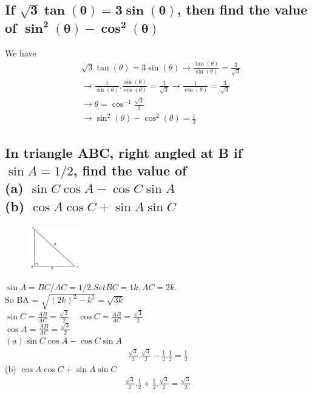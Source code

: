 \documentclass{article}
\begin{document}
\begin{multicols}{2}

\subsection{If $\mathbf{\sqrt{3}\tan(\theta)=3\sin(\theta)}$, then find the value of $\mathbf{\sin^2(\theta)-\cos^2(\theta)}$ }

We have
\begin{align*}
    &\sqrt{3} \tan(\theta) = 3\sin(\theta) \rightarrow \frac{\tan(\theta)}{\sin(\theta)} = \frac{3}{\sqrt{3}} \\
    & \rightarrow \frac{1}{\sin(\theta)}.\frac{\sin(\theta)}{\cos(\theta)} = \frac{3}{\sqrt{3}} \rightarrow \frac{1}{\cos(\theta)} = \frac{3}{\sqrt{3}} \\
    & \rightarrow \theta = \cos^{-1}{\frac{\sqrt{3}}{3}} \\
    & \rightarrow \sin^2(\theta) - \cos^2(\theta) = \frac{1}{3}
\end{align*}

\subsection{In triangle ABC, right angled at B if $\sin A = 1/2$, find the value of \\
(a) $\sin C \cos A - \cos C \sin A$ \\
(b) $\cos A \cos C + \sin A \sin C$
}

\begin{figure}[H]
    \centering
    \includegraphics[width=0.2\textwidth]{expert-Tr2.png}
\end{figure}

\noindent $\sin A = BC/AC = 1/2. Set BC = 1k, AC = 2k.$ \\
So BA = $\sqrt{(2k)^2-k^2} = \sqrt{3k}$ \\
$\sin C = \frac{AB}{AC} = \frac{\sqrt{3}}{2} \quad \cos C=\frac{AB}{AC} = \frac{\sqrt{3}}{2}$ \\
$\cos A= \frac{AB}{AC} = \frac{\sqrt{3}}{2}$ \\
$(a) \sin C \cos A - \cos C \sin A $\\
\begin{align*}
    \frac{\sqrt{3}}{2}.\frac{\sqrt{3}}{2} - \frac{1}{2}.\frac{1}{2}= \frac{1}{2} 
\end{align*}
(b) $\cos A \cos C + \sin A \sin C$
\begin{align*}
    \frac{\sqrt{3}}{2}.\frac{1}{2} + \frac{1}{2}.\frac{\sqrt{3}}{2}= \frac{\sqrt{3}}{2} 
\end{align*}

\end{multicols}
\end{document}
